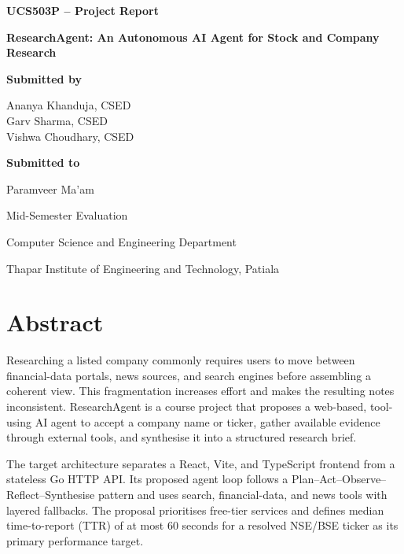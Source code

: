 \documentclass[12pt,a4paper,oneside]{report}
\begin{document}
\begin{titlepage}\centering
\vspace*{0.7cm}
{\Large\bfseries UCS503P -- Project Report\par}
\vspace{1.5cm}
{\Huge\bfseries ResearchAgent: An Autonomous AI Agent for Stock and Company Research\par}
\vspace{0.5cm}{\Large Prototype-Stage Report\par}
\vspace{1.5cm}
{\large\bfseries Submitted by\par}\vspace{0.4cm}
Ananya Khanduja, CSED \\
Garv Sharma, CSED \\
Vishwa Choudhary, CSED \\
\vspace{1.2cm}
{\large\bfseries Submitted to\par}\vspace{0.3cm}
{\Large Paramveer Ma'am\par}
\vfill
{\large Mid-Semester Evaluation\par}
{\large Computer Science and Engineering Department\par}
{\large Thapar Institute of Engineering and Technology, Patiala\par}
\vspace{0.5cm}{\large October 2026\par}
\end{titlepage}

\chapter*{Abstract}
Researching a listed company commonly requires users to move between financial-data portals, news sources, and search engines before assembling a coherent view. This fragmentation increases effort and makes the resulting notes inconsistent. ResearchAgent is a course project that proposes a web-based, tool-using AI agent to accept a company name or ticker, gather available evidence through external tools, and synthesise it into a structured research brief.

The target architecture separates a React, Vite, and TypeScript frontend from a stateless Go HTTP API. Its proposed agent loop follows a Plan--Act--Observe--Reflect--Synthesise pattern and uses search, financial-data, and news tools with layered fallbacks. The proposal prioritises free-tier services and defines median time-to-report (TTR) of at most 60 seconds for a resolved NSE/BSE ticker as its primary performance target.
\end{document}
